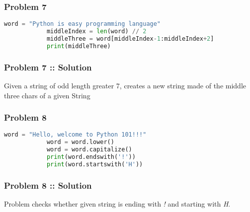 \documentclass[14pt]{beamer}
\begin{document}
    \begin{frame}[containsverbatim]
        \frametitle{Problem 7}
        \begin{lstlisting}[language=Python]
            word = "Python is easy programming language"
            middleIndex = len(word) // 2
            middleThree = word[middleIndex-1:middleIndex+2]
            print(middleThree)
        \end{lstlisting}
    \end{frame}

    \begin{frame}
        \frametitle{Problem 7 :: Solution}
        Given a string of odd length greater 7, creates a new string made of the middle three chars of a given String
    \end{frame}
    \begin{frame}[containsverbatim]
        \frametitle{Problem 8}
        \begin{lstlisting}[language=Python]
            word = "Hello, welcome to Python 101!!!"
            word = word.lower()
            word = word.capitalize()
            print(word.endswith('!'))
            print(word.startswith('H'))
        \end{lstlisting}
    \end{frame}
    \begin{frame}
        \frametitle{Problem 8 :: Solution}
        Problem checks whether given string is ending with  \emph{!} and starting with \emph{H}.
    \end{frame}
\end{document}
